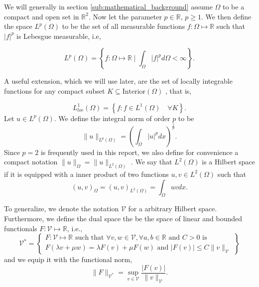 We will generally in section \ref{sub:mathematical_background} assume $\Omega $ to be a compact and open set in $\mathbb{R} ^{2}$. Now let the parameter $p \in \mathbb{R} $, $p\ge 1$. We then define the space $L^{p}\left( \Omega  \right) $ to be the set of all measurable functions $f: \Omega  \mapsto \mathbb{R} $ such that
$\left\lvert f \right\rvert ^{p}$ is Lebesgue measurable, i.e,

\begin{equation*}
    L^{p}\left( \Omega  \right) = \left\{ f: \Omega \mapsto \mathbb{R}  \mid \int_{\Omega }^{} \left\lvert f \right\rvert ^{p} d \Omega  < \infty  \right\}
.\end{equation*}

A useful extension, which we will use later, are the set of locally integrable functions for any compact subset $K \subseteq \text{Interior}\left( \Omega  \right) $ \cite{brenner07math}, that is,

\begin{equation*}
    L_{loc}^{1}\left( \Omega  \right)  = \left\{ f: f \in L^{1}\left( \Omega  \right)  \quad \forall K  \right\}.
\end{equation*}
Let $u \in L^{p}\left( \Omega  \right) $. We define the integral norm of order $p$ to be \[
\| u \|_{ L^{p}\left( \Omega  \right)  }^{  }  = \left( \int_{\Omega }^{} \left\lvert u \right\rvert ^{p} dx  \right) ^{\frac{1}{p}}.
\]
Since $p=2$ is frequently used in this report, we also define for convenience a compact notation $\| u \|_{ \Omega  }^{  }  = \| u \|_{ L^{2}\left( \Omega  \right)  }^{  } $ .  We say that $L^{2}\left( \Omega  \right) $ is a Hilbert space if it is equipped with a inner
product of two functions $u,v \in L^{2}\left( \Omega  \right) $ such that
\[
\left( u,v \right) _{\Omega } = \left( u,v \right) _{L^2\left( \Omega  \right) } = \int_{\Omega }^{} u  v dx.
\]

To generalize, we denote the notation $\mathcal{V} $ for a arbitrary Hilbert space. Furthermore, we define the dual space the be the space of linear and bounded functionals $F: \mathcal{V}  \mapsto \mathbb{R} $\cite{quartdiff}, i.e., \[
\mathcal{V} ^{*} =
\left.
\begin{cases}
F: \mathcal{V}  \mapsto \mathbb{R} \text{ such that }\forall v,w \in \mathcal{V}, \forall a,b \in \mathbb{R} \text{ and } C> 0 \text{ is }   \\
  F\left( \lambda v + \mu w  \right) = \lambda F(v) + \mu F(w) \text{ and } \left\lvert F\left( v \right)  \right\rvert \le C \| v \|_{ \mathcal{V}  }^{  }
\end{cases}
  \right\}
\]
and we equip it with the functional norm,  \[
    \| F \|_{ \mathcal{V} ^{*} }^{  } = \sup_{v \in \mathcal{V}   } \frac{\left\lvert F\left( v \right)  \right\rvert }{\| v \|_{ \mathcal{V}  }^{  } }.
\]

